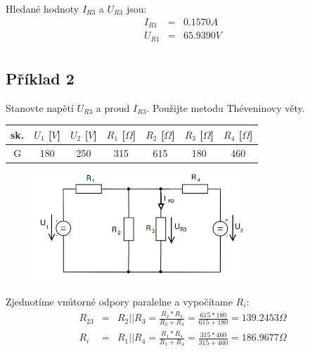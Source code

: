 \documentclass[a4paper,oneside,12pt]{article}
\begin{document}
	Hledané hodnoty $I_{R3}$ a $U_{R3}$ jsou:
	\begin{eqnarray*}
		I_{R1} &= & 0.1570A\\
		U_{R1} &= & 65.9390V\\
	\end{eqnarray*}

	\newpage

	\subsection{Příklad 2}

	Stanovte napětí $U_{R3}$ a proud $I_{R3}$. Použijte metodu Théveninovy věty.

	\begin{table}[h]
		\begin{center}
			\begin{tabular}{|c|c|c|c|c|c|c|}
				\hline
				sk. & $U_{1}$ [$V$] & $U_{2}$ [$V$] & $R_{1}$ [$\Omega$] & $R_{2}$ [$\Omega$] & $R_{3}$ [$\Omega$] & $R_{4}$ [$\Omega$]\\
				\hline
				G & 180 & 250 & 315 & 615 & 180 & 460 \\
				\hline
			\end{tabular}
		\end{center}
	\end{table}

	\begin{figure}[h]
		\begin{center}
			\includegraphics[width=8cm,keepaspectratio]{pr2.png}
		\end{center}
	\end{figure}

	Zjednotíme vnútorné odpory paralelne a vypočítame $R_{i}$:
	\begin{eqnarray*}
		R_{23} &= & R_{2} || R_{3} = \frac{R_{2} * R_{3}}{R_{2} + R_{3}} = \frac{615 * 180}{615 + 180} = 139.2453 \Omega\\
		R_{i} &= & R_{1} || R_{4} = \frac{R_{1} * R_{4}}{R_{1} + R_{4}} = \frac{315 * 460}{315 + 460} = 186.9677 \Omega\\
	\end{eqnarray*}
\end{document}
